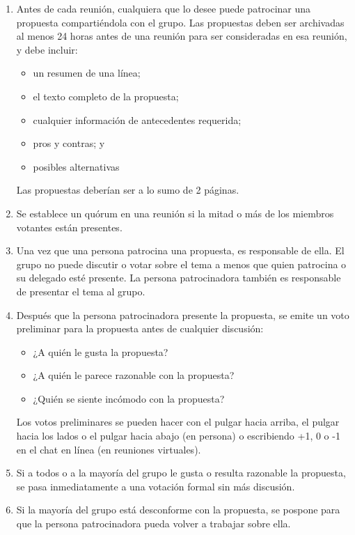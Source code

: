 \begin{enumerate}

\item
  Antes de cada reunión,
  cualquiera que lo desee puede patrocinar una propuesta compartiéndola con el grupo.
  Las propuestas deben ser archivadas al menos 24 horas antes de una reunión para ser consideradas en esa reunión,
  y debe incluir:
  \begin{itemize}
  \item un resumen de una línea;
  \item el texto completo de la propuesta;
  \item cualquier información de antecedentes requerida;
  \item pros y contras; y
  \item posibles alternativas
  \end{itemize}
  Las propuestas deberían ser a lo sumo de 2 páginas.

\item
  Se establece un quórum en una reunión si la mitad o más de los miembros votantes están presentes.

\item
  Una vez que una persona patrocina una propuesta,
  es responsable de ella.
  El grupo no puede discutir o votar sobre el tema a menos que quien patrocina o su delegado esté presente.
  La persona patrocinadora también es responsable de presentar el tema al grupo.

\item
  Después que la persona patrocinadora presente la propuesta,
  se emite un voto preliminar para la propuesta antes de cualquier discusión:
  \begin{itemize}
  \item ¿A quién le gusta la propuesta?
  \item ¿A quién le parece razonable con la propuesta?
  \item ¿Quién se siente incómodo con la propuesta?
  \end{itemize}
  Los votos preliminares se pueden hacer con el pulgar hacia arriba, el pulgar hacia los lados o el pulgar hacia abajo (en persona)
  o escribiendo +1, 0 o -1 en el chat en línea (en reuniones virtuales).

\item
  Si a todos o a la mayoría del grupo le gusta o resulta razonable la propuesta,
  se pasa inmediatamente a una votación formal sin más discusión.

\item
  Si la mayoría del grupo está desconforme con la propuesta,
  se pospone para que la persona patrocinadora pueda volver a trabajar sobre ella.


\end{enumerate}
